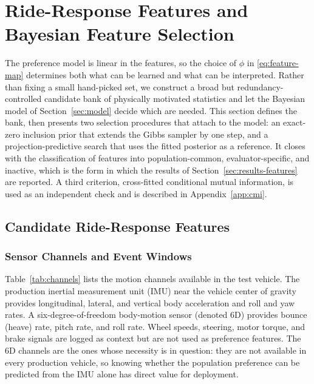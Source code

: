 \documentclass[lettersize,journal]{IEEEtran}
\begin{document}
\section{Ride-Response Features and Bayesian Feature Selection}
\label{sec:features}

The preference model is linear in the features, so the choice of $\phi$ in \eqref{eq:feature-map} determines both what can be learned and what can be interpreted. Rather than fixing a small hand-picked set, we construct a broad but redundancy-controlled candidate bank of physically motivated statistics and let the Bayesian model of Section~\ref{sec:model} decide which are needed. This section defines the bank, then presents two selection procedures that attach to the model: an exact-zero inclusion prior that extends the Gibbs sampler by one step, and a projection-predictive search that uses the fitted posterior as a reference. It closes with the classification of features into population-common, evaluator-specific, and inactive, which is the form in which the results of Section~\ref{sec:results-features} are reported. A third criterion, cross-fitted conditional mutual information, is used as an independent check and is described in Appendix~\ref{app:cmi}.

\subsection{Candidate Ride-Response Features}
\label{sec:bank}

\subsubsection{Sensor Channels and Event Windows}
Table~\ref{tab:channels} lists the motion channels available in the test vehicle. The production inertial measurement unit (IMU) near the vehicle center of gravity provides longitudinal, lateral, and vertical body acceleration and roll and yaw rates. A six-degree-of-freedom body-motion sensor (denoted 6D) provides bounce (heave) rate, pitch rate, and roll rate. Wheel speeds, steering, motor torque, and brake signals are logged as context but are not used as preference features. The 6D channels are the ones whose necessity is in question: they are not available in every production vehicle, so knowing whether the population preference can be predicted from the IMU alone has direct value for deployment.
\end{document}
